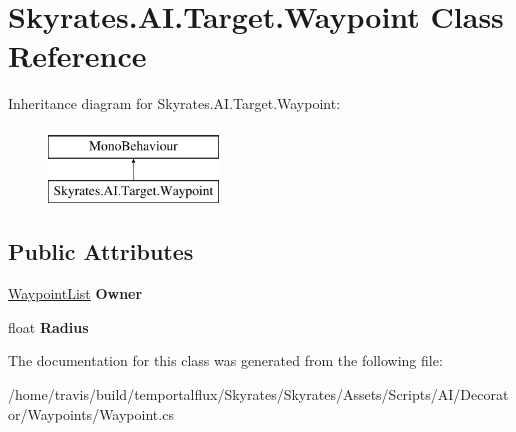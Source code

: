 \hypertarget{class_skyrates_1_1_a_i_1_1_target_1_1_waypoint}{\section{Skyrates.\-A\-I.\-Target.\-Waypoint Class Reference}
\label{class_skyrates_1_1_a_i_1_1_target_1_1_waypoint}
}
Inheritance diagram for Skyrates.\-A\-I.\-Target.\-Waypoint\-:\begin{figure}[H]
\begin{center}
\leavevmode
\includegraphics[height=2.000000cm]{class_skyrates_1_1_a_i_1_1_target_1_1_waypoint}
\end{center}
\end{figure}
\subsection*{Public Attributes}
\begin{DoxyCompactItemize}
\item 
\hypertarget{class_skyrates_1_1_a_i_1_1_target_1_1_waypoint_a26ff36865c09dfefc0d3235e9143a18a}{\hyperlink{class_skyrates_1_1_a_i_1_1_target_1_1_waypoint_list}{Waypoint\-List} {\bfseries Owner}}\label{class_skyrates_1_1_a_i_1_1_target_1_1_waypoint_a26ff36865c09dfefc0d3235e9143a18a}

\item 
\hypertarget{class_skyrates_1_1_a_i_1_1_target_1_1_waypoint_a6a8cfa9cae3d62cdaecd8caa8309b81b}{float {\bfseries Radius}}\label{class_skyrates_1_1_a_i_1_1_target_1_1_waypoint_a6a8cfa9cae3d62cdaecd8caa8309b81b}

\end{DoxyCompactItemize}


The documentation for this class was generated from the following file\-:\begin{DoxyCompactItemize}
\item 
/home/travis/build/temportalflux/\-Skyrates/\-Skyrates/\-Assets/\-Scripts/\-A\-I/\-Decorator/\-Waypoints/Waypoint.\-cs\end{DoxyCompactItemize}
